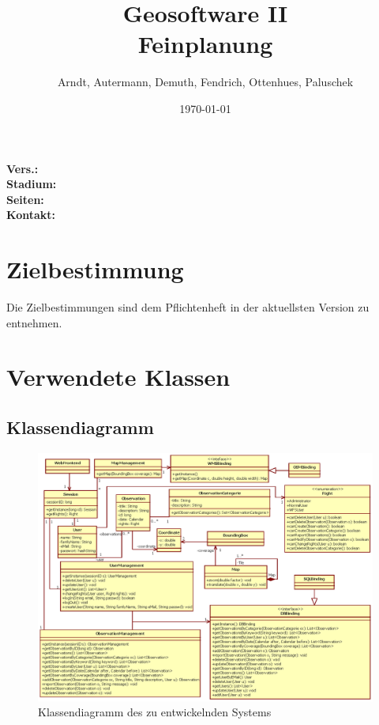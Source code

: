 \documentclass[a4paper,11pt]{scrartcl}
\begin{document}
\title{Geosoftware II \\ \small Feinplanung}
\author{Arndt, Autermann, Demuth, Fendrich, Ottenhues, Paluschek}
\date{\today}
\maketitle
\thispagestyle{empty}

\begin{center}
\bf Vers.: \MyVersion \\
\bf Stadium: \MyStatus\\
\bf Seiten: \thelastpage \\
\bf Kontakt: \email \\
\end{center}
\newpage

\tableofcontents

\newpage

\section{Zielbestimmung}
	Die Zielbestimmungen sind dem Pflichtenheft in der aktuellsten Version zu entnehmen.\\

	
\section{Verwendete Klassen}

\subsection{Klassendiagramm}
\begin{landscape}
\begin{figure}[h]
		\centering
		\includegraphics[height=1.00\textwidth]{images/klassendiagramm.eps}
		\caption{Klassendiagramm des zu entwickelnden Systems}
		\label{Klassendiagramm}

\end{figure}
\end{landscape}
\end{document}
